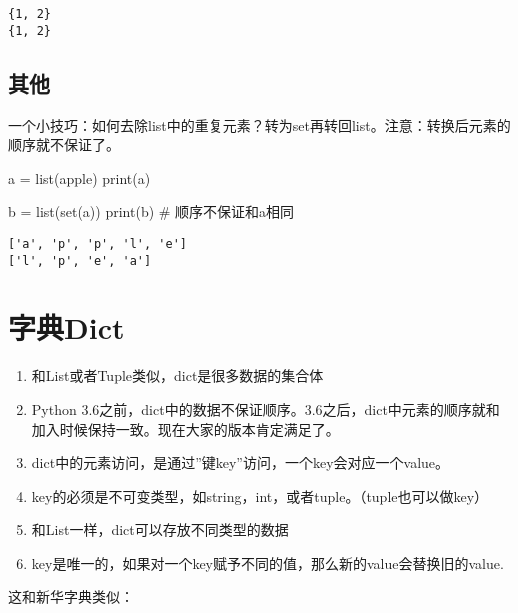 \documentclass[
  letterpaper,
  DIV=11,
  numbers=noendperiod]{scrreprt}
\newenvironment{Shaded}{\begin{snugshade}}{\end{snugshade}}
\newcommand{\BuiltInTok}[1]{\textcolor[rgb]{0.00,0.23,0.31}{#1}}
\newcommand{\CommentTok}[1]{\textcolor[rgb]{0.37,0.37,0.37}{#1}}
\newcommand{\NormalTok}[1]{\textcolor[rgb]{0.00,0.23,0.31}{#1}}
\newcommand{\OperatorTok}[1]{\textcolor[rgb]{0.37,0.37,0.37}{#1}}
\newcommand{\StringTok}[1]{\textcolor[rgb]{0.13,0.47,0.30}{#1}}
\providecommand{\tightlist}{%
  \setlength{\itemsep}{0pt}\setlength{\parskip}{0pt}}\usepackage{longtable,booktabs,array}
\begin{document}
\begin{verbatim}
{1, 2}
{1, 2}
\end{verbatim}

\hypertarget{ux5176ux4ed6}{%
\subsection{其他}\label{ux5176ux4ed6}}

一个小技巧：如何去除list中的重复元素？转为set再转回list。注意：转换后元素的顺序就不保证了。

\begin{Shaded}
\begin{Highlighting}[]
\NormalTok{a }\OperatorTok{=} \BuiltInTok{list}\NormalTok{(}\StringTok{\textquotesingle{}apple\textquotesingle{}}\NormalTok{)}
\BuiltInTok{print}\NormalTok{(a)}

\NormalTok{b }\OperatorTok{=} \BuiltInTok{list}\NormalTok{(}\BuiltInTok{set}\NormalTok{(a))}
\BuiltInTok{print}\NormalTok{(b) }\CommentTok{\# 顺序不保证和a相同}
\end{Highlighting}
\end{Shaded}

\begin{verbatim}
['a', 'p', 'p', 'l', 'e']
['l', 'p', 'e', 'a']
\end{verbatim}

\hypertarget{ux5b57ux5178dict}{%
\section{字典Dict}\label{ux5b57ux5178dict}}

\begin{enumerate}
\def\labelenumi{\arabic{enumi}.}
\tightlist
\item
  和List或者Tuple类似，dict是很多数据的集合体
\item
  Python
  3.6之前，dict中的数据不保证顺序。3.6之后，dict中元素的顺序就和加入时候保持一致。现在大家的版本肯定满足了。
\item
  dict中的元素访问，是通过''键key''访问，一个key会对应一个value。
\item
  key的必须是不可变类型，如string，int，或者tuple。（tuple也可以做key）
\item
  和List一样，dict可以存放不同类型的数据
\item
  key是唯一的，如果对一个key赋予不同的值，那么新的value会替换旧的value.
\end{enumerate}

这和新华字典类似：
\end{document}
